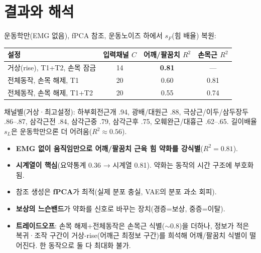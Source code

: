 \documentclass[11pt]{article}
\begin{document}
\section{결과와 해석}
운동학만(EMG 없음), fPCA 참조, 운동노이즈 하에서 $s_F$(힘 배율) 복원:
\begin{center}\small
\begin{tabular}{l c c c}
\hline\hline
설정 & 입력채널 $C$ & 어깨/팔꿈치 $R^2$ & 손목근 $R^2$ \\ \hline
거상(rise), T1+T2, 손목 잠금 & 14 & \textbf{0.81} & --- \\
전체동작, 손목 해제, T1 & 20 & 0.60 & 0.81 \\
전체동작, 손목 해제, T1+T2 & 20 & 0.55 & 0.74 \\ \hline\hline
\end{tabular}
\end{center}
채널별(거상·최고설정): 하부회전근개 .94, 광배/대원근 .88, 극상근/이두/삼두장두 .86--.87, 삼각근전 .84, 삼각근중 .79, 삼각근후 .75, 오훼완근/대흉근 .62--.65. 길이배율 $s_L$은 운동학만으론 더 어려움($R^2{\approx}0.56$).
\begin{itemize}
\item[(1)] \textbf{EMG 없이 움직임만으로 어깨/팔꿈치 근육 힘 약화를 강식별}($R^2{=}0.81$).
\item[(2)] \textbf{시계열이 핵심}(요약통계 0.36 → 시계열 0.81). 약화는 동작의 시간 구조에 부호화됨.
\item[(3)] 참조 생성은 \textbf{fPCA}가 최적(실제 분포 충실, VAE의 분포 과소 회피).
\item[(4)] \textbf{보상의 느슨밴드}가 약화를 신호로 바꾸는 장치(경증=보상, 중증=이탈).
\item[(5)] \textbf{트레이드오프}: 손목 해제+전체동작은 손목근 식별($\sim$0.8)을 더하나, 정보가 적은 복귀·조작 구간이 거상-rise(어깨근 최정보 구간)를 희석해 어깨/팔꿈치 식별이 떨어진다. 한 동작으로 둘 다 최대화 불가.
\end{itemize}
\end{document}

